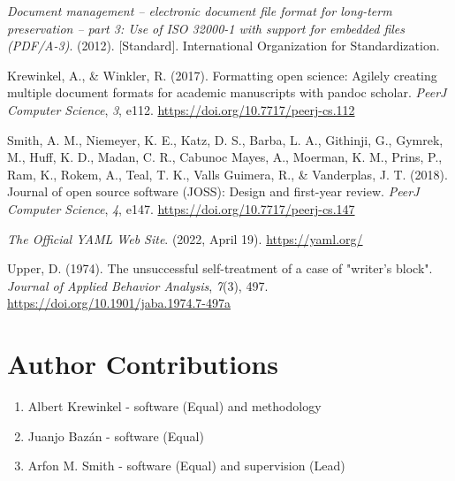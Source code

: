 \documentclass[
]{article}
\newlength{\cslhangindent}
\newlength{\cslentryspacingunit} %
\newenvironment{CSLReferences}[2] %
 {%
  \setlength{\parindent}{0pt}
  \ifodd #1
  \let\oldpar\par
  \def\par{\hangindent=\cslhangindent\oldpar}
  \fi
  \setlength{\parskip}{#2\cslentryspacingunit}
 }%
 {}
\begin{document}
\hypertarget{refs}{}
\begin{CSLReferences}{1}{0}
\leavevmode{}%
\emph{Document management -- electronic document file format for
long-term preservation -- part 3: Use of {ISO} 32000-1 with support for
embedded files ({PDF/A-3})}. (2012). {[}Standard{]}. International
Organization for Standardization.

\leavevmode{}%
Krewinkel, A., \& Winkler, R. (2017). Formatting open science: Agilely
creating multiple document formats for academic manuscripts with pandoc
scholar. \emph{PeerJ Computer Science}, \emph{3}, e112.
\url{https://doi.org/10.7717/peerj-cs.112}

\leavevmode{}%
Smith, A. M., Niemeyer, K. E., Katz, D. S., Barba, L. A., Githinji, G.,
Gymrek, M., Huff, K. D., Madan, C. R., Cabunoc Mayes, A., Moerman, K.
M., Prins, P., Ram, K., Rokem, A., Teal, T. K., Valls Guimera, R., \&
Vanderplas, J. T. (2018). Journal of open source software (JOSS): Design
and first-year review. \emph{PeerJ Computer Science}, \emph{4}, e147.
\url{https://doi.org/10.7717/peerj-cs.147}

\leavevmode{}%
\emph{The {Official YAML Web Site}}. (2022, April 19).
\url{https://yaml.org/}

\leavevmode{}%
Upper, D. (1974). The unsuccessful self-treatment of a case of "writer's
block". \emph{Journal of Applied Behavior Analysis}, \emph{7}(3), 497.
\url{https://doi.org/10.1901/jaba.1974.7-497a}

\end{CSLReferences}

\section{Author Contributions}\label{author-contributions}
\begin{enumerate}
\item Albert Krewinkel - software (Equal) and methodology
\item Juanjo Bazán - software (Equal)
\item Arfon M. Smith - software (Equal) and supervision (Lead)
\end{enumerate}
\end{document}
